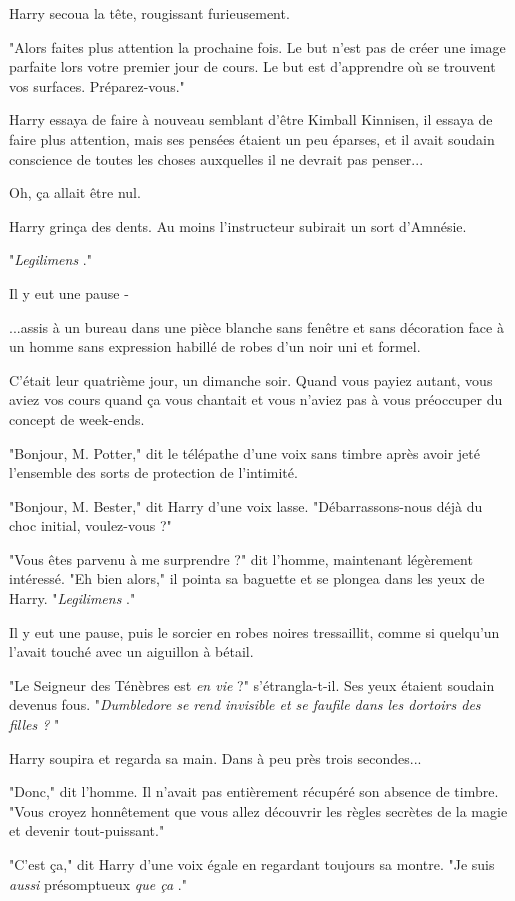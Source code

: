 Harry secoua la tête, rougissant furieusement.

"Alors faites plus attention la prochaine fois. Le but n'est pas de créer une image parfaite lors votre premier jour de cours. Le but est d'apprendre où se trouvent vos surfaces. Préparez-vous."

Harry essaya de faire à nouveau semblant d'être Kimball Kinnisen, il essaya de faire plus attention, mais ses pensées étaient un peu éparses, et il avait soudain conscience de toutes les choses auxquelles il ne devrait pas penser...

Oh, ça allait être nul.

Harry grinça des dents. Au moins l'instructeur subirait un sort d'Amnésie.

"\emph{Legilimens} ."

Il y eut une pause -

...assis à un bureau dans une pièce blanche sans fenêtre et sans décoration face à un homme sans expression habillé de robes d'un noir uni et formel.

C'était leur quatrième jour, un dimanche soir. Quand vous payiez autant, vous aviez vos cours quand ça vous chantait et vous n'aviez pas à vous préoccuper du concept de week-ends.

"Bonjour, M. Potter," dit le télépathe d'une voix sans timbre après avoir jeté l'ensemble des sorts de protection de l'intimité.

"Bonjour, M. Bester," dit Harry d'une voix lasse. "Débarrassons-nous déjà du choc initial, voulez-vous ?"

"Vous êtes parvenu à me surprendre ?" dit l'homme, maintenant légèrement intéressé. "Eh bien alors," il pointa sa baguette et se plongea dans les yeux de Harry. "\emph{Legilimens} ."

Il y eut une pause, puis le sorcier en robes noires tressaillit, comme si quelqu'un l'avait touché avec un aiguillon à bétail.

"Le Seigneur des Ténèbres est \emph{en vie}  ?" s'étrangla-t-il. Ses yeux étaient soudain devenus fous. "\emph{Dumbledore se rend invisible et se faufile dans les dortoirs des filles ?} "

Harry soupira et regarda sa main. Dans à peu près trois secondes...

"Donc," dit l'homme. Il n'avait pas entièrement récupéré son absence de timbre. "Vous croyez honnêtement que vous allez découvrir les règles secrètes de la magie et devenir tout-puissant."

"C'est ça," dit Harry d'une voix égale en regardant toujours sa montre. "Je suis \emph{aussi}  présomptueux \emph{que ça} ."

